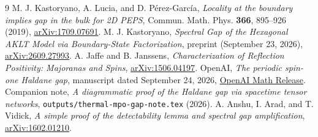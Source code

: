 \documentclass[11pt]{article}
\begin{document}
\begin{thebibliography}{9}
	\setlength{\itemsep}{2pt plus 1pt}
	\setlength{\parskip}{0pt}
	M. J. Kastoryano, A. Lucia, and D. P\'erez-Garc\'ia,
	\emph{Locality at the boundary implies gap in the bulk for 2D PEPS},
	Commun. Math. Phys. \textbf{366}, 895--926 (2019),
	\href{https://arxiv.org/abs/1709.07691}{arXiv:1709.07691}.
	M. J. Kastoryano,
	\emph{Spectral Gap of the Hexagonal AKLT Model via Boundary-State
		Factorization}, preprint (September 23, 2026),
	\href{https://arxiv.org/abs/2609.27993}{arXiv:2609.27993}.
	A. Jaffe and B. Janssens,
	\emph{Characterization of Reflection Positivity: Majoranas and Spins},
	\href{https://arxiv.org/abs/1506.04197}{arXiv:1506.04197}.
	OpenAI, \emph{The periodic spin-one Haldane gap},
	manuscript dated September 24, 2026,
	\href{https://github.com/openai/math/blob/main/preprints/The-periodic-spin-one-Haldane-gap-September-24-2026/paper.pdf}{OpenAI Math Release}.
	Companion note, \emph{A diagrammatic proof of the Haldane gap via spacetime
		tensor networks}, \texttt{outputs/thermal-mpo-gap-note.tex} (2026).
	A. Anshu, I. Arad, and T. Vidick,
	\emph{A simple proof of the detectability lemma and spectral gap amplification},
	\href{https://arxiv.org/abs/1602.01210}{arXiv:1602.01210}.
\end{thebibliography}
\end{document}

